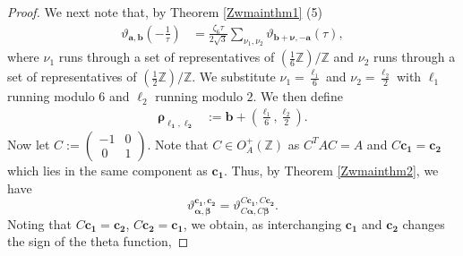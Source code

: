 \documentclass[12pt,reqno]{amsart}
\renewcommand{\a}{\alpha}
\renewcommand{\b}{\beta}
\renewcommand{\t}{\tau}
\newcommand{\z}{\zeta}
\renewcommand{\(}{\left\(}
\renewcommand{\)}{\right\)}
\newcommand{\os}[2]{\overset{#1}{#2}}
\numberwithin{equation}{section}
\theoremstyle{plain}
\theoremstyle{definition}
\numberwithin{equation}{section}
\renewcommand{\pmod}[1]{\ \left( \mathrm{mod} \, #1 \right)}
\begin{document}
\begin{proof}
We next note that, by Theorem \ref{Zwmainthm1} (5)
\begin{align}\label{star}
\vartheta_{\bm{a},\bm{b}}\left(-\frac{1}{\t}\right)%
&=\frac{\z_6\t}{2\sqrt{3}}\sum_{\nu_1,\nu_2}\vartheta_{\bm{b}+\bm{\nu},-\bm{a}}(\t),
\end{align}
where $\nu_1$ runs through a set of representatives of $(\frac 16\mathbb{Z})/\mathbb{Z}$ and $\nu_2$ runs through a set of representatives of $(\frac 12\mathbb{Z})/\mathbb{Z}$. We substitute $\nu_1=\frac{\ell_1}{6}$ and $\nu_2=\frac{\ell_2}{2}$ with $\ell_1$ running modulo $6$ and $\ell_2$ running modulo $2$. We then define
\begin{align}\label{l1l2}
\bm{\rho_{\ell_1,\ell_2}}&:=\bm{b}+\left(\frac{\ell_1}{6},\frac{\ell_2}{2}\right).%
\end{align}
Now let $C:=(\begin{smallmatrix}
-1&0\\
\ 0&1
\end{smallmatrix})$. Note that  $C\in O^{+}_{A}(\mathbb{Z})$ as $C^TAC=A$ and $C\bm{c_1}=\bm{c_2}$ which lies in the same component as $\bm{c_1}$. Thus, by Theorem \ref{Zwmainthm2}, we have
\begin{equation*}
\vartheta^{\bm{c_1}, \bm{c_2}}_{\bm{\a},\bm{\b}}=\vartheta^{C\bm{c_1}, C\bm{c_2}}_{C\bm{\a},C\bm{\b}}.
\end{equation*}
Noting that $C\bm{c_1}=\bm{c_2}$, $C\bm{c_2}=\bm{c_1}$, we obtain, as interchanging $\bm{c_1}$ and $\bm{c_2}$ changes the sign of the theta function, 

\end{proof}
\end{document}
